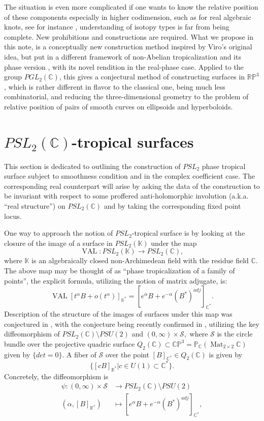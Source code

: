 \documentclass[pdflatex,sn-mathphys-num]{sn-jnl}%
\theoremstyle{thmstyleone}%
\theoremstyle{thmstyletwo}%
\theoremstyle{thmstylethree}%
\newcommand{\R}{\mathbb{R}}
\newcommand{\RP}{\mathbb{R}\mathbb{P}}
\newcommand{\C}{\mathbb{C}}
\newcommand{\p}{{\mathbb{P}}}
\newcommand{\K}{{\mathbb{K}}}
\begin{document}
The situation is even more complicated if one wants to know the relative position of these components especially in higher codimension, such as for real algebraic knots, see for instance \cite{B11,MO19}, understanding of isotopy types is far from being complete. New prohibitions and constructions are required. What we propose in this note, is a conceptually new construction method inspired by Viro's original idea, but put
in a different framework of non-Abelian tropicalization \cite{MS22} and its phase version \cite{SP24}, with its novel rendition in the real-phase case. Applied to the group $PGL_2(\C)$, this gives a conjectural method of constructing surfaces in $\RP^3$, which is rather different in flavor to the classical one, being much less combinatorial, and reducing the three-dimensional geometry to the problem of relative position of pairs of smooth curves on ellipsoids and hyperboloids.



\section{$PSL_2(\C)$-tropical surfaces}
This section is dedicated to outlining the construction of $PSL_2$ phase tropical surface subject to smoothness condition and in the complex coefficient case. The corresponding real counterpart will arise by asking the data of the construction to be invariant with respect to some proffered anti-holomorphic involution (a.k.a. “real structure”) on $PSL_2(\mathbb{C})$ and by taking the corresponding fixed point locus.

One way to approach the notion of $PSL_2$-tropical surface is by looking at the closure of the image of a surface in $PSL_2(\mathbb{K})$ under the map $$\operatorname{VAL}: PSL_2(\K)\rightarrow PSL_2(\C),$$ where $\K$ is an algebraically closed non-Archimedean field with the residue field $\C$. The above map may be thought of as “phase tropicalization of a family of points”, the explicit formula, utilizing the notion of matrix adjugate, is: $$\operatorname{VAL}[t^\alpha B+o(t^\alpha)]_{\K^*}=[e^\alpha B+e^{-\alpha}(B^*)^{adj}]_{\C^*}.$$
Description of the structure of the images of surfaces under this map was conjectured in \cite{SP25}, with the conjecture being recently confirmed in \cite{B-LS26}, utilizing the key diffeomorphism of $PSL_2(\C)\setminus PSU(2)$ and $(0,\infty)\times\mathcal{S},$ where $\mathcal{S}$ is the circle bundle over the projective quadric surface $Q_2(\C)\subset\C\p^3=\p_{\C}(\operatorname{Mat}_{2\times 2}\C)$ given by $\{det=0\}$. A fiber of $\mathcal{S}$ over the point $[B]_{\C^*}\in Q_2(\C)$ is given by $$\{[cB]_{\R^*}|c\in U(1)\subset {\C}^*\}.$$
Concretely, the diffeomorphism is 
\begin{align*}
	\psi: (0,\infty)\times\mathcal{S}&\longrightarrow PSL_2(\C)\setminus PSU(2)\\
	(\alpha,[B]_{\R^*})&\longmapsto [e^\alpha B+e^{-\alpha}(B^*)^{adj}]_{\C^*},
\end{align*}
\end{document}
